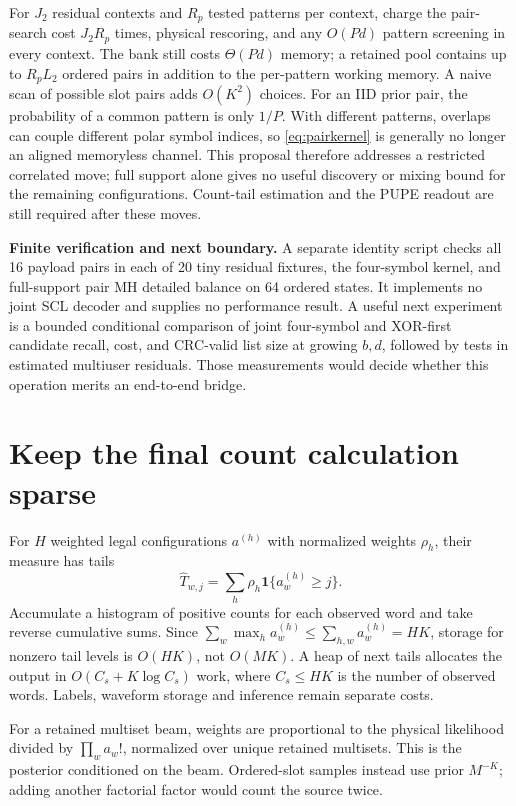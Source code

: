 \documentclass[10pt,a4paper]{article}
\newcommand{\ind}{\mathbf 1}
\begin{document}
For $J_2$ residual contexts and $R_p$ tested patterns per context, charge the pair-search cost
$J_2R_p$ times, physical rescoring, and any $O(Pd)$ pattern screening in every context. The bank still
costs $\Theta(Pd)$ memory; a retained pool contains up to $R_pL_2$ ordered pairs in addition to the
per-pattern working memory. A naive scan of possible slot pairs adds $O(K^2)$ choices.
For an IID prior pair, the probability of a common pattern is only $1/P$. With different patterns,
overlaps can couple different polar symbol indices, so \eqref{eq:pairkernel} is generally no longer
an aligned memoryless channel. This proposal therefore addresses a restricted correlated move;
full support alone gives no useful discovery or mixing bound for the remaining configurations.
Count-tail estimation and the PUPE readout are still required after these moves.

\textbf{Finite verification and next boundary.} A separate identity script checks all 16 payload pairs
in each of 20 tiny residual fixtures, the four-symbol kernel, and full-support pair MH detailed balance
on 64 ordered states. It implements no joint SCL decoder and supplies no performance result.
A useful next experiment is a bounded conditional comparison of joint four-symbol and XOR-first
candidate recall, cost, and CRC-valid list size at growing $b,d$, followed by tests in estimated
multiuser residuals. Those measurements would decide whether this operation merits an end-to-end bridge.

\section{Keep the final count calculation sparse}
For $H$ weighted legal configurations $a^{(h)}$ with normalized weights $\rho_h$, their measure has tails
\[
 \widehat T_{w,j}=\sum_h\rho_h\ind\{a_w^{(h)}\geq j\}.
\]
Accumulate a histogram of positive counts for each observed word and take reverse cumulative sums.
Since $\sum_w\max_h a_w^{(h)}\leq\sum_{h,w}a_w^{(h)}=HK$, storage for nonzero tail levels is $O(HK)$,
not $O(MK)$. A heap of next tails allocates the output in $O(C_s+K\log C_s)$ work, where $C_s\leq HK$
is the number of observed words. Labels, waveform storage and inference remain separate costs.

For a retained multiset beam, weights are proportional to the physical likelihood divided by
$\prod_w a_w!$, normalized over unique retained multisets. This is the posterior conditioned on the beam.
Ordered-slot samples instead use prior $M^{-K}$; adding another factorial factor would count the source twice.
\end{document}

